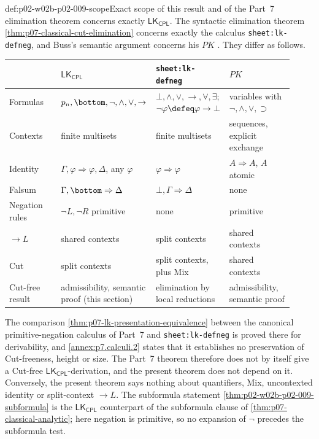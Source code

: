 \begin{hbconvention}{def:p02-w02b-p02-009-scope}{Exact scope of this result and of the Part~7 elimination theorem}
 concerns exactly
\(\mathsf{LK}_{\mathsf{CPL}}\).  The syntactic elimination theorem
\cref{thm:p07-classical-cut-elimination} concerns exactly the calculus
\texttt{sheet:lk-defneg}, and Buss's semantic argument concerns his \(PK\)
\cite[Sec.~1.2.2, pp.~11--12]{Buss1998Intro}.  They differ as follows.
\begin{center}
\small
\begin{tabular}{@{}p{0.2\linewidth}p{0.24\linewidth}p{0.24\linewidth}p{0.24\linewidth}@{}}
\toprule
 & \(\mathsf{LK}_{\mathsf{CPL}}\) & \texttt{sheet:lk-defneg} & \(PK\) \\
\midrule
Formulas & \(p_n,\bottom,\neg,\land,\lor,\to\) &
 \(\bot,\land,\lor,\to,\forall,\exists\); \(\neg\varphi\defeq\varphi\to\bot\) &
 variables with \(\neg,\land,\lor,\supset\) \\
Contexts & finite multisets & finite multisets & sequences, explicit exchange \\
Identity & \(\Gamma,\varphi\Rightarrow\varphi,\Delta\), any \(\varphi\) &
 \(\varphi\Rightarrow\varphi\) & \(A\Rightarrow A\), \(A\) atomic \\
Falsum & \(\Gamma,\bottom\Rightarrow\Delta\) & \(\bot,\Gamma\Rightarrow\Delta\) & none \\
Negation rules & \(\neg L,\neg R\) primitive & none & primitive \\
\(\to L\) & shared contexts & split contexts & shared contexts \\
Cut & split contexts & split contexts, plus Mix & shared contexts \\
Cut-free result & admissibility, semantic proof (this section) &
 elimination by local reductions & admissibility, semantic proof \\
\bottomrule
\end{tabular}
\end{center}
The comparison \cref{thm:p07-lk-presentation-equivalence} between the
canonical primitive-negation calculus of Part~7 and
\texttt{sheet:lk-defneg} is proved there for derivability, and
\cref{annex:p7.calculi.2} states that it establishes no preservation of
Cut-freeness, height or size.  The Part~7 theorem therefore does not by itself give a
Cut-free \(\mathsf{LK}_{\mathsf{CPL}}\)-derivation, and the present theorem
does not depend on it.  Conversely, the present theorem says nothing about
quantifiers, Mix, uncontexted identity or split-context \(\to L\).  The
subformula statement \cref{thm:p02-w02b-p02-009-subformula} is the
\(\mathsf{LK}_{\mathsf{CPL}}\) counterpart of
the subformula clause of \cref{thm:p07-classical-analytic}; here negation is primitive, so no
expansion of \(\neg\) precedes the subformula test.
\end{hbconvention}

